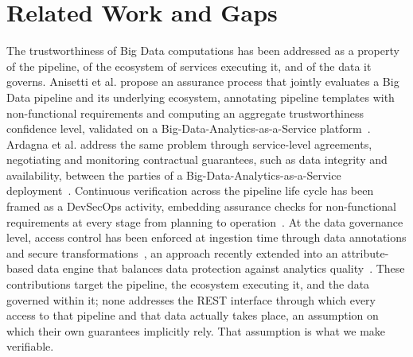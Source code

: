\section{Related Work and Gaps}
\label{sec:related}


The trustworthiness of Big Data computations has been addressed as a property of the pipeline, of the ecosystem of services executing it, and of the data it governs.
Anisetti et al. propose an assurance process that jointly evaluates a Big Data pipeline and its underlying ecosystem, annotating pipeline templates with non-functional requirements and computing an aggregate trustworthiness confidence level, validated on a Big-Data-Analytics-as-a-Service platform~\cite{anisettiAssuranceProcessBig2023}.
Ardagna et al. address the same problem through service-level agreements, negotiating and monitoring contractual guarantees, such as data integrity and availability, between the parties of a Big-Data-Analytics-as-a-Service deployment~\cite{ardagnaBigDataAssurance2023}.
Continuous verification across the pipeline life cycle has been framed as a DevSecOps activity, embedding assurance checks for non-functional requirements at every stage from planning to operation~\cite{anisettiDevSecOpsbasedAssuranceProcess2022}.
At the data governance level, access control has been enforced at ingestion time through data annotations and secure transformations~\cite{anisettiDynamicScalableEnforcement2021}, an approach recently extended into an attribute-based data engine that balances data protection against analytics quality~\cite{polimenoBalancingProtectionQuality2025}.
These contributions target the pipeline, the ecosystem executing it, and the data governed within it; none addresses the REST interface through which every access to that pipeline and that data actually takes place, an assumption on which their own guarantees implicitly rely.
That assumption is what we make verifiable.

